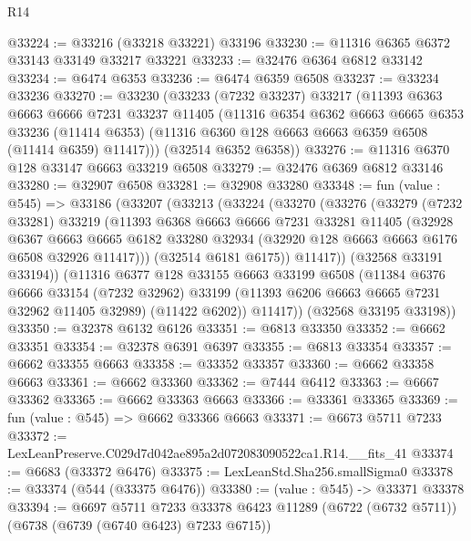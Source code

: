 \begin{lexlean}{R14}
\begin{coremodule}
@33224 := @33216 (@33218 @33221) @33196
@33230 := @11316 @6365 @6372 @33143 @33149 @33217 @33221
@33233 := @32476 @6364 @6812 @33142
@33234 := @6474 @6353
@33236 := @6474 @6359 @6508
@33237 := @33234 @33236
@33270 := @33230
    (@33233
      (@7232 @33237)
      @33217
      (@11393
        @6363
        @6663
        @6666
        @7231
        @33237
        @11405
        (@11316
          @6354
          @6362
          @6663
          @6665
          @6353
          @33236
          (@11414 @6353)
          (@11316 @6360 @128 @6663 @6663 @6359 @6508 (@11414 @6359) @11417)))
      (@32514 @6352 @6358))
@33276 := @11316 @6370 @128 @33147 @6663 @33219 @6508
@33279 := @32476 @6369 @6812 @33146
@33280 := @32907 @6508
@33281 := @32908 @33280
@33348 := fun (value : @545) =>
  @33186
    (@33207
      (@33213
        (@33224
          (@33270
            (@33276
              (@33279
                (@7232 @33281)
                @33219
                (@11393
                  @6368
                  @6663
                  @6666
                  @7231
                  @33281
                  @11405
                  (@32928
                    @6367
                    @6663
                    @6665
                    @6182
                    @33280
                    @32934
                    (@32920 @128 @6663 @6663 @6176 @6508 @32926 @11417)))
                (@32514 @6181 @6175))
              @11417))
          (@32568 @33191 @33194))
        (@11316
          @6377
          @128
          @33155
          @6663
          @33199
          @6508
          (@11384
            @6376
            @6666
            @33154
            (@7232 @32962)
            @33199
            (@11393 @6206 @6663 @6665 @7231 @32962 @11405 @32989)
            (@11422 @6202))
          @11417))
      (@32568 @33195 @33198))
@33350 := @32378 @6132 @6126
@33351 := @6813 @33350
@33352 := @6662 @33351
@33354 := @32378 @6391 @6397
@33355 := @6813 @33354
@33357 := @6662 @33355 @6663
@33358 := @33352 @33357
@33360 := @6662 @33358 @6663
@33361 := @6662 @33360
@33362 := @7444 @6412
@33363 := @6667 @33362
@33365 := @6662 @33363 @6663
@33366 := @33361 @33365
@33369 := fun (value : @545) => @6662 @33366 @6663
@33371 := @6673 @5711 @7233
@33372 := LexLeanPreserve.C029d7d042ae895a2d072083090522ca1.R14.__fits_41
@33374 := @6683 (@33372 @6476)
@33375 := LexLeanStd.Sha256.smallSigma0
@33378 := @33374 (@544 (@33375 @6476))
@33380 := (value : @545) -> @33371 @33378
@33394 := @6697
    @5711
    @7233
    @33378
    @6423
    @11289
    (@6722 (@6732 @5711))
    (@6738 (@6739 (@6740 @6423) @7233 @6715))

\end{coremodule}
\end{lexlean}
